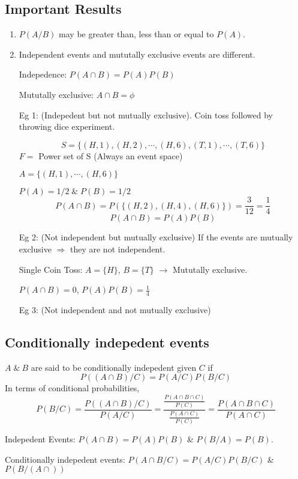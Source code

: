 \documentclass{article}
\begin{document}
\subsection{Important Results}
\begin{enumerate}
    \item $P(A/B)$ may be greater than, less than or equal to $P(A)$.
    \item Independent events and mututally exclusive events are different.

    Indepedence: $P(A \cap B)= P(A)P(B)$

    Mututally exclusive: $A \cap B = \phi$

    Eg 1: (Indepedent but not mutually exclusive). Coin toss followed by throwing dice experiment.

    $$ S=\{ (H,1), (H,2), \cdots, (H,6), (T,1), \cdots, (T,6)\}$$
    $F=$ Power set of S (Always an event space)

    $A=\{(H,1), \cdots, (H,6) \}$ %

    $P(A)= 1/2 \; \& \; P(B)= 1/2$
    $$ P(A \cap B)= P(\{ (H,2), (H,4), (H,6)\})= \frac{3}{12}= \frac{1}{4}$$
    $$ P(A\cap B)= P(A)P(B)$$

    Eg 2: (Not independent but mutually exclusive)
    If the events are mutually exclusive $\Rightarrow$ they are not independent.

    Single Coin Toss: $A= \{H \}$, $B= \{T \}$ $\rightarrow$ Mututally exclusive.

    $P(A \cap B)= 0$, $P(A)P(B)= \frac{1}{4}$

    Eg 3: (Not independent and not mutually exclusive) %
\end{enumerate}

\subsection{Conditionally indepedent events}

$A \; \& \: B$ are said to be conditionally indepedent given $C$ if
$$ P((A \cap B)/ C)= P(A/C)P(B/C)$$
In terms of conditional probabilities,
$$ P(B/C)= \frac{P((A\cap B )/ C)}{P(A/C)}= \frac{\frac{P(A \cap B \cap C)}{P(C)}}{\frac{P(A \cap C)}{P(C)}} = \frac{P(A\cap B\cap C)}{P(A \cap C)}$$ %

Indepedent Events: $P(A \cap B)= P(A)P(B)$ \& $P(B/A)= P(B)$.

Conditionally indepedent events: $P(A\cap B / C)= P(A/C)P(B/C)$ \& $P(B/(A\cap ))$
\end{document}
